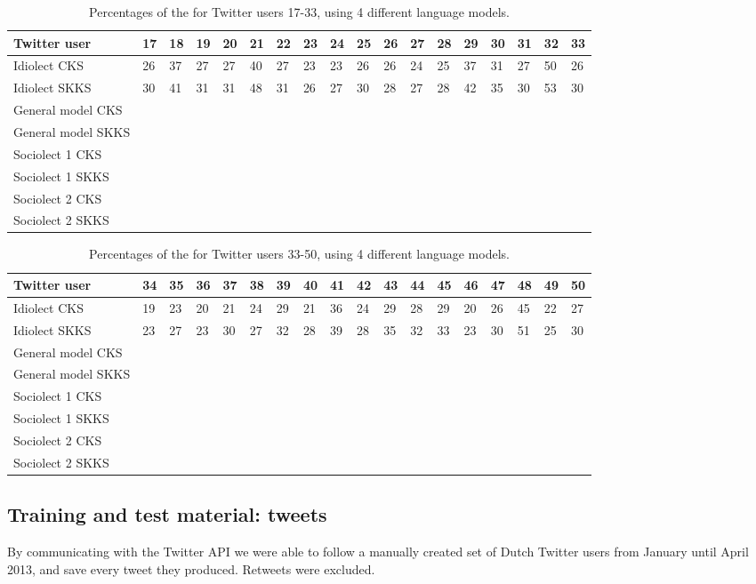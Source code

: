 \documentclass[11pt]{article}
\begin{document}
\begin{table*}[t]
\begin{tabular}{l|*{17}{l}}
Twitter user&17&18&19&20&21&22&23&24&25&26&27&28&29&30&31&32&33\\
\hline
Idiolect CKS&26&37&27&27&40&27&23&23&26&26&24&25&37&31&27&50&26\\
Idiolect SKKS&30&41&31&31&48&31&26&27&30&28&27&28&42&35&30&53&30\\
\hline
General model CKS\\
General model SKKS\\
\hline
Sociolect 1 CKS\\
Sociolect 1 SKKS\\
\hline
Sociolect 2 CKS\\
Sociolect 2 SKKS\\
\end{tabular}
\caption{Percentages of the for Twitter users 17-33, using 4 different language models.}
\label{result2}
\end{table*}

\begin{table*}[t]
\begin{tabular}{l|*{17}{l}}
Twitter user&34&35&36&37&38&39&40&41&42&43&44&45&46&47&48&49&50\\
\hline
Idiolect CKS&19&23&20&21&24&29&21&36&24&29&28&29&20&26&45&22&27\\
Idiolect SKKS&23&27&23&30&27&32&28&39&28&35&32&33&23&30&51&25&30\\
\hline
General model CKS\\
General model SKKS\\
\hline
Sociolect 1 CKS\\
Sociolect 1 SKKS\\
\hline
Sociolect 2 CKS\\
Sociolect 2 SKKS\\
\end{tabular}
\label{result3}
\caption{Percentages of the for Twitter users 33-50, using 4 different language models.}
\end{table*}


\subsection{Training and test material: tweets}

By communicating with the Twitter API we were able to follow a manually created set of Dutch Twitter users from January until April 2013, and save every tweet they produced. Retweets were excluded.
\end{document}
